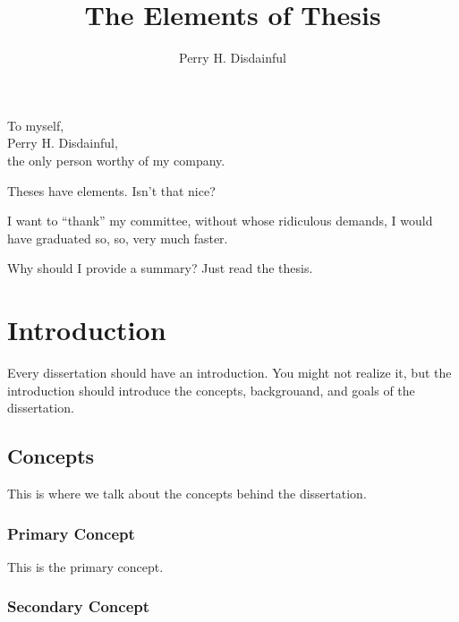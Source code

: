 \documentclass[12pt]{gatech-thesis}
\title{The Elements of Thesis} %
\author{Perry H. Disdainful}
\begin{document}

\begin{preliminary}
\begin{dedication}
\null\vfil
{\large
\begin{center}
To myself,\\\vspace{12pt}
Perry H. Disdainful,\\\vspace{12pt}
the only person worthy of my company.
\end{center}}
\vfil\null
\end{dedication}
\begin{preface}
Theses have elements.  Isn't that nice?
\end{preface}
\begin{acknowledgements}
I want to ``thank'' my committee, without whose ridiculous demands, I
would have graduated so, so, very much faster.
\end{acknowledgements}
\contents
\begin{summary}
Why should I provide a summary?  Just read the thesis.
\end{summary}
\end{preliminary}
\chapter{Introduction}

Every dissertation should have an introduction.  You might not realize
it, but the introduction should introduce the concepts, backgrouand,
and goals of the dissertation.

\section{Concepts}

This is where we talk about the concepts behind the dissertation.

\subsection{Primary Concept}

This is the primary concept.

\subsection{Secondary Concept}
\end{document}
